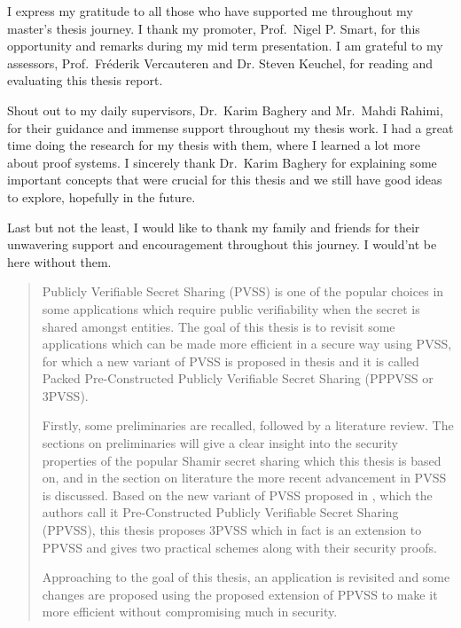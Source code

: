 \documentclass[master=mcs]{kulemt}
\begin{document}
\begin{preface}
  I express my gratitude to all those who have supported me throughout my master's thesis 
  journey. I thank my promoter, Prof.\ Nigel P. Smart, for this opportunity and remarks 
  during my mid term presentation. I am grateful to my assessors, Prof.\ Fréderik Vercauteren and 
  Dr. Steven Keuchel, for reading and evaluating this thesis report.\par

  Shout out to my daily supervisors, Dr.\ Karim Baghery and Mr.\ Mahdi Rahimi, for their 
  guidance and immense support throughout my thesis work. I had a great time doing the research 
  for my thesis with them, where I learned a lot more about proof systems. I sincerely 
  thank Dr.\ Karim Baghery for explaining some important concepts that were crucial 
  for this thesis and we still have good ideas to explore, hopefully in the future.\par

  Last but not the least, I would like to thank my family and friends for their
  unwavering support and encouragement throughout this journey. I would'nt be here without them.
\end{preface}

\tableofcontents*

\begin{abstract}
  Publicly Verifiable Secret Sharing (PVSS) is one of the popular choices in some applications 
  which require public verifiability when the secret is shared amongst entities. The goal 
  of this thesis is to revisit some applications which can be made more efficient in a 
  secure way using PVSS, for which a new variant of PVSS is proposed in thesis and it is 
  called Packed Pre-Constructed Publicly Verifiable Secret Sharing (PPPVSS or 3PVSS).\par
  
  Firstly, some preliminaries are recalled, followed by a literature review. The 
  sections on preliminaries will give a clear insight into the security properties of 
  the popular Shamir secret sharing which this thesis is based on, and in the section 
  on literature the more recent advancement in PVSS is discussed. Based on 
  the new variant of PVSS proposed in \cite{cryptoeprint:2025/576}, which the authors 
  call it Pre-Constructed Publicly Verifiable Secret Sharing (PPVSS), this thesis 
  proposes 3PVSS which in fact is an extension to PPVSS and gives two practical 
  schemes along with their security proofs.\par

  Approaching to the goal of this thesis, an application is revisited and some changes are proposed 
  using the proposed extension of PPVSS to make it more efficient without 
  compromising much in security.\par
\end{abstract}
\end{document}
